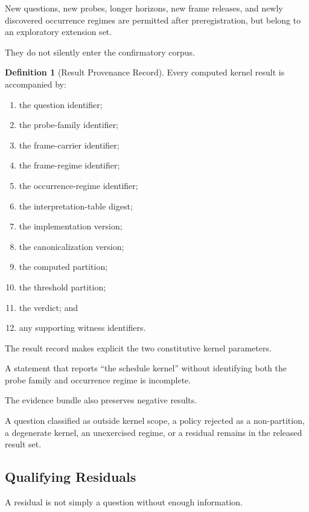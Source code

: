 \documentclass[11pt]{article}
\theoremstyle{plain}
\theoremstyle{definition}
\newtheorem{definition}[theorem]{Definition}
\theoremstyle{remark}
\begin{document}
New questions,
new probes,
longer horizons,
new frame releases,
and newly discovered occurrence regimes
are permitted after preregistration,
but belong to an exploratory extension set.

They do not silently enter the confirmatory corpus.

\begin{definition}[Result Provenance Record]
  \label{ik.def.result-provenance}
  Every computed kernel result
  is accompanied by:
  \begin{enumerate}[label=(\alph*)]
    \item the question identifier;
    \item the probe-family identifier;
    \item the frame-carrier identifier;
    \item the frame-regime identifier;
    \item the occurrence-regime identifier;
    \item the interpretation-table digest;
    \item the implementation version;
    \item the canonicalization version;
    \item the computed partition;
    \item the threshold partition;
    \item the verdict; and
    \item any supporting witness identifiers.
  \end{enumerate}
\end{definition}

The result record makes explicit
the two constitutive kernel parameters.

A statement that reports ``the schedule kernel'' without identifying
both the probe family and occurrence regime is incomplete.

The evidence bundle also preserves negative results.

A question classified as outside kernel scope,
a policy rejected as a non-partition,
a degenerate kernel,
an unexercised regime,
or a residual remains in the released result set.

\subsection{Qualifying Residuals}

A residual is not simply a question without enough information.
\end{document}
